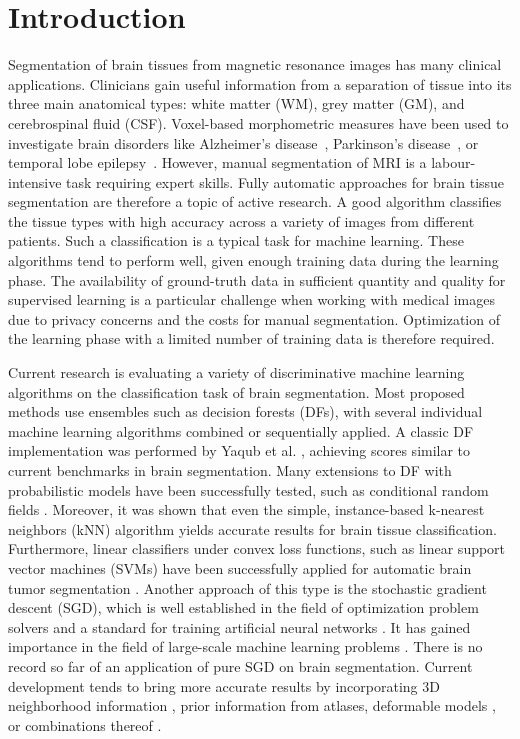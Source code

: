 \documentclass[journal]{IEEEtran}
\begin{document}
\section{Introduction}\label{s.introduction}
Segmentation of brain tissues from magnetic resonance images has many clinical applications. Clinicians gain useful information from a separation of tissue into its three main anatomical types: white matter (WM), grey matter (GM), and cerebrospinal fluid (CSF). Voxel-based morphometric measures have been used to investigate brain disorders like Alzheimer’s disease~\cite{busatto2003voxel}, Parkinson's disease~\cite{price2004voxel}, or temporal lobe epilepsy~\cite{rummel2017personalized}. However, manual segmentation of MRI is a labour-intensive task requiring expert skills. Fully automatic approaches for brain tissue segmentation are therefore a topic of active research. A good algorithm classifies the tissue types with high accuracy across a variety of images from different patients. Such a classification is a typical task for machine learning. These algorithms tend to perform well, given enough training data during the learning phase. The availability of ground-truth data in sufficient quantity and quality for supervised learning is a particular challenge when working with medical images due to privacy concerns and the costs for manual segmentation. Optimization of the learning phase with a limited number of training data is therefore required.

Current research is evaluating a variety of discriminative machine learning algorithms on the classification task of brain segmentation. Most proposed methods use ensembles such as decision forests (DFs), with several individual machine learning algorithms combined or sequentially applied. A classic DF implementation was performed by Yaqub et al. \cite{Yaqub2014}, achieving scores similar to current benchmarks in brain segmentation. Many extensions to DF with probabilistic models have been successfully tested, such as conditional random fields \cite{Pereira2016}. Moreover, it was shown that even the simple, instance-based k-nearest neighbors (kNN) algorithm yields accurate results \cite{Anbeek2004,Cocosco2003,Warfield2000} for brain tissue classification. Furthermore, linear classifiers under convex loss functions, such as linear support vector machines (SVMs) have been successfully applied for automatic brain tumor segmentation \cite{Bauer2011}. Another approach of this type is the stochastic gradient descent (SGD), which is well established in the field of optimization problem solvers and a standard for training artificial neural networks \cite{LeCun1998}. It has gained importance in the field of large-scale machine learning problems \cite{Bottou2010}. There is no record so far of an application of pure SGD on brain segmentation. Current development tends to bring more accurate results by incorporating 3D neighborhood information \cite{Li2011,Despotovic2013}, prior information from atlases\cite{Pohl2006,Ashburner2005}, deformable models \cite{Moreno2014}, or combinations thereof \cite{Ortiz2014}.
\end{document}
